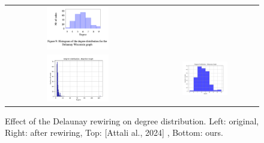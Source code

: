 \documentclass[10pt, aspectratio = 169]{beamer}
\begin{document}
\begin{frame}
\begin{columns}[t]
\begin{column}{0.5\textwidth}
\begin{figure}
\begin{tabular}{cc}
                    \includegraphics[width=0.45\textwidth]{figures/Wisconsin_degree_hist_original.png} \\
                    \includegraphics[width=0.45\textwidth]{figures/baseline_degree_dist_baseline_graph_20250314_180715.png} &
                    \includegraphics[width=0.45\textwidth]{figures/delaunay_degree_dist_delaunay_graph_20250314_180840.png}
                \end{tabular}
                \caption{Effect of the Delaunay rewiring on degree distribution. 
                Left: original, Right: after rewiring, Top: [Attali al., 2024] \cite{attali2024delaunay}, Bottom: ours.}
            \end{figure}
        \end{column}
    \end{columns}
\end{frame}
\end{document}
